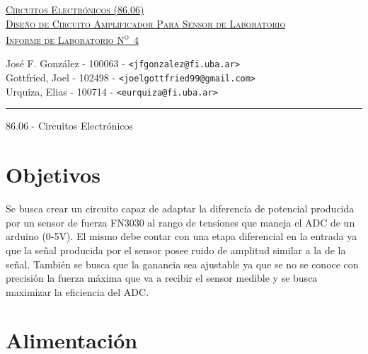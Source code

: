 \documentclass[a4paper, 10pt, spanish]{article}
\begin{document}
\begin{titlepage}
\vfill

\begin{center} %
\Large{\underline{\textsc{Circuitos Electrónicos (86.06)}}}\\ \vspace{0.5cm}
\Large{\underline{\textsc{Diseño de Circuito Amplificador Para Sensor de Laboratorio}}}\\ \vspace{0.5cm}
\Large{\underline{\textsc{Informe de Laboratorio N\textsuperscript{o}~4}}}
\end{center}

\vfill

\begin{center}
\large{José F. González - 100063 - \footnotesize{\verb!<jfgonzalez@fi.uba.ar>!}}\\ \vspace{0.25cm}
\large{Gottfried, Joel - 102498 - \footnotesize{\verb!<joelgottfried99@gmail.com>!}}\\\vspace{0.25cm}
\large{Urquiza, Elias - 100714 - \footnotesize{\verb!<eurquiza@fi.uba.ar>!}}\\
\end{center}

\vfill

\hrule
\vspace{0.2cm}

\noindent\small{86.06 - Circuitos Electrónicos \hfill }

\end{titlepage}

%
%
\tableofcontents
\newpage


\section{Objetivos}
    Se busca crear un circuito capaz de adaptar la diferencia de potencial producida por un sensor de fuerza FN3030 al rango de tensiones que maneja el ADC de un arduino (0-5V). El mismo debe contar con una etapa diferencial en la entrada ya que la señal producida por el sensor posee ruido de amplitud similar a la de la señal.
    También se busca que la ganancia sea ajustable ya que se no se conoce con precisión la fuerza máxima que va a recibir el sensor medible y se busca maximizar la eficiencia del ADC.

\section{Alimentación}
\end{document}
